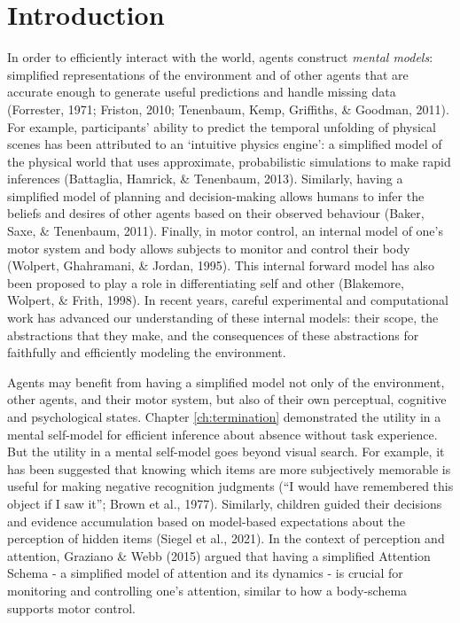 \documentclass[12pt,twoside]{reedthesis}
\begin{document}
\hypertarget{introduction-2}{%
\section{Introduction}\label{introduction-2}}

In order to efficiently interact with the world, agents construct \emph{mental models}: simplified representations of the environment and of other agents that are accurate enough to generate useful predictions and handle missing data (Forrester, 1971; Friston, 2010; Tenenbaum, Kemp, Griffiths, \& Goodman, 2011). For example, participants' ability to predict the temporal unfolding of physical scenes has been attributed to an `intuitive physics engine': a simplified model of the physical world that uses approximate, probabilistic simulations to make rapid inferences (Battaglia, Hamrick, \& Tenenbaum, 2013). Similarly, having a simplified model of planning and decision-making allows humans to infer the beliefs and desires of other agents based on their observed behaviour (Baker, Saxe, \& Tenenbaum, 2011). Finally, in motor control, an internal model of one's motor system and body allows subjects to monitor and control their body (Wolpert, Ghahramani, \& Jordan, 1995). This internal forward model has also been proposed to play a role in differentiating self and other (Blakemore, Wolpert, \& Frith, 1998). In recent years, careful experimental and computational work has advanced our understanding of these internal models: their scope, the abstractions that they make, and the consequences of these abstractions for faithfully and efficiently modeling the environment.

Agents may benefit from having a simplified model not only of the environment, other agents, and their motor system, but also of their own perceptual, cognitive and psychological states. Chapter \ref{ch:termination} demonstrated the utility in a mental self-model for efficient inference about absence without task experience. But the utility in a mental self-model goes beyond visual search. For example, it has been suggested that knowing which items are more subjectively memorable is useful for making negative recognition judgments (``I would have remembered this object if I saw it''; Brown et al., 1977). Similarly, children guided their decisions and evidence accumulation based on model-based expectations about the perception of hidden items (Siegel et al., 2021). In the context of perception and attention, Graziano \& Webb (2015) argued that having a simplified Attention Schema - a simplified model of attention and its dynamics - is crucial for monitoring and controlling one's attention, similar to how a body-schema supports motor control.
\end{document}

